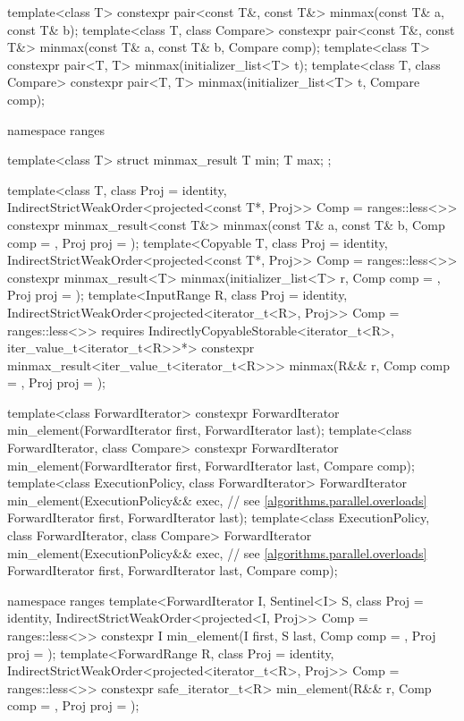 \begin{codeblock}
{  template<class T> constexpr pair<const T&, const T&> minmax(const T& a, const T& b);
  template<class T, class Compare>
    constexpr pair<const T&, const T&> minmax(const T& a, const T& b, Compare comp);
  template<class T>
    constexpr pair<T, T> minmax(initializer_list<T> t);
  template<class T, class Compare>
    constexpr pair<T, T> minmax(initializer_list<T> t, Compare comp);

  namespace ranges {
    template<class T>
    struct minmax_result {
      T min;
      T max;
    };

    template<class T, class Proj = identity,
             IndirectStrictWeakOrder<projected<const T*, Proj>> Comp = ranges::less<>>
      constexpr minmax_result<const T&>
        minmax(const T& a, const T& b, Comp comp = {}, Proj proj = {});
    template<Copyable T, class Proj = identity,
             IndirectStrictWeakOrder<projected<const T*, Proj>> Comp = ranges::less<>>
      constexpr minmax_result<T>
        minmax(initializer_list<T> r, Comp comp = {}, Proj proj = {});
    template<InputRange R, class Proj = identity,
             IndirectStrictWeakOrder<projected<iterator_t<R>, Proj>> Comp = ranges::less<>>
      requires IndirectlyCopyableStorable<iterator_t<R>, iter_value_t<iterator_t<R>>*>
      constexpr minmax_result<iter_value_t<iterator_t<R>>>
        minmax(R&& r, Comp comp = {}, Proj proj = {});
  }

  template<class ForwardIterator>
    constexpr ForwardIterator min_element(ForwardIterator first, ForwardIterator last);
  template<class ForwardIterator, class Compare>
    constexpr ForwardIterator min_element(ForwardIterator first, ForwardIterator last,
                                          Compare comp);
  template<class ExecutionPolicy, class ForwardIterator>
    ForwardIterator min_element(ExecutionPolicy&& exec, // see \ref{algorithms.parallel.overloads}
                                ForwardIterator first, ForwardIterator last);
  template<class ExecutionPolicy, class ForwardIterator, class Compare>
    ForwardIterator min_element(ExecutionPolicy&& exec, // see \ref{algorithms.parallel.overloads}
                                ForwardIterator first, ForwardIterator last,
                                Compare comp);

  namespace ranges {
    template<ForwardIterator I, Sentinel<I> S, class Proj = identity,
             IndirectStrictWeakOrder<projected<I, Proj>> Comp = ranges::less<>>
      constexpr I min_element(I first, S last, Comp comp = {}, Proj proj = {});
    template<ForwardRange R, class Proj = identity,
             IndirectStrictWeakOrder<projected<iterator_t<R>, Proj>> Comp = ranges::less<>>
      constexpr safe_iterator_t<R>
        min_element(R&& r, Comp comp = {}, Proj proj = {});
  }

}
\end{codeblock}
